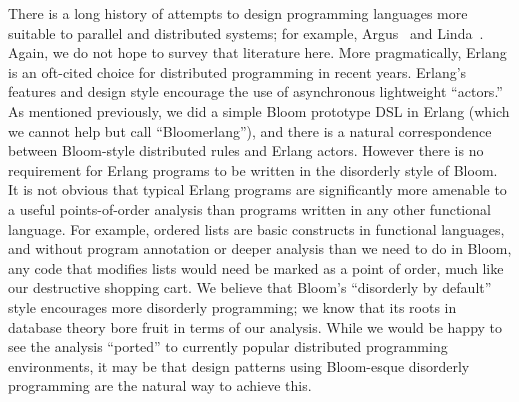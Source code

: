 There is a long history of attempts to design programming languages more
suitable to parallel and distributed systems; for example, Argus~\cite{argus}
and Linda~\cite{linda}.  Again, we do not hope to survey that literature here.
More pragmatically, Erlang is an oft-cited choice for distributed programming in
recent years.  Erlang's features and design style encourage the use of
asynchronous lightweight ``actors.''  As mentioned previously, we did a simple
Bloom prototype DSL in Erlang (which we cannot help but call ``Bloomerlang''),
and there is a natural correspondence between Bloom-style distributed rules and
Erlang actors.  However there is no requirement for Erlang programs to be
written in the disorderly style of Bloom. It is not obvious that typical Erlang
programs are significantly more amenable to a useful points-of-order analysis
than programs written in any other functional language.  For example, ordered
lists are basic constructs in functional languages, and without program
annotation or deeper analysis than we need to do in Bloom, any code that
modifies lists would need be marked as a point of order, much like our
destructive shopping cart.  We believe that Bloom's ``disorderly by default''
style encourages more disorderly programming; we know that its roots in database
theory bore fruit in terms of our analysis.  While we would be happy to see the
analysis ``ported'' to currently popular distributed programming environments,
it may be that design patterns using Bloom-esque disorderly programming are the
natural way to achieve this.
